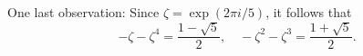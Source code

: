 One last observation: 
Since $\zeta=\exp(2\pi i/5)$, it follows
that 
\[
-\zeta-\zeta^4=\frac{1-\sqrt{5}}{2},
\quad 
-\zeta^2-\zeta^3=\frac{1+\sqrt{5}}{2}.
\]










